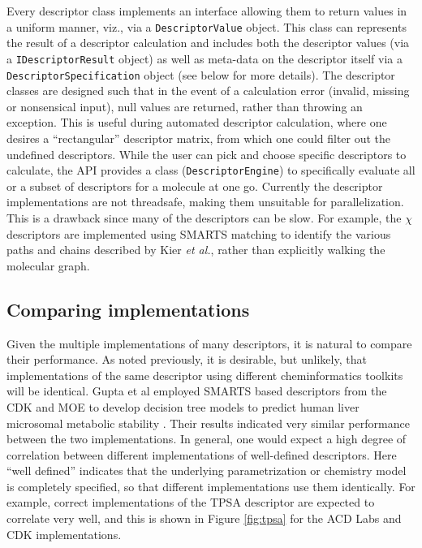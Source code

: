 \documentclass[letterpaper, 12pt]{article}
\begin{document}
Every descriptor class implements an interface allowing them to return
values in a uniform manner, viz., via a \texttt{DescriptorValue}
object. This class can represents the result of a descriptor
calculation and includes both the descriptor values (via a
\texttt{IDescriptorResult} object) as well as meta-data on the
descriptor itself via a \texttt{DescriptorSpecification} object (see
below for more details). The descriptor classes are designed such that
in the event of a calculation error (invalid, missing or nonsensical
input), null values are returned, rather than throwing an
exception. This is useful during automated descriptor calculation,
where one desires a ``rectangular'' descriptor matrix, from which one
could filter out the undefined descriptors. While the user can pick
and choose specific descriptors to calculate, the API provides a class
(\texttt{DescriptorEngine}) to specifically evaluate all or a subset
of descriptors for a molecule at one go.  Currently the descriptor
implementations are not threadsafe, making them unsuitable for
parallelization. This is a drawback since many of the descriptors can
be slow. For example, the $\chi$ descriptors \cite{Kier:1976aa} are
implemented using SMARTS matching to identify the various paths and
chains described by Kier \textit{et al.}, rather than explicitly
walking the molecular graph.

\subsection{Comparing implementations}
\label{sec:comp-impl}


Given the multiple implementations of many descriptors, it is natural
to compare their performance. As noted previously, it is desirable,
but unlikely, that implementations of the same descriptor using
different cheminformatics toolkits will be identical. Gupta et al
employed SMARTS based descriptors from the CDK and MOE to develop
decision tree models to predict human liver microsomal metabolic
stability \cite{Gupta:2010uq}. Their results indicated very similar
performance between the two implementations. In general, one would
expect a high degree of correlation between different implementations
of well-defined descriptors. Here ``well defined'' indicates that the
underlying parametrization or chemistry model is completely specified,
so that different implementations use them identically. For example,
correct implementations of the TPSA descriptor are expected to
correlate very well, and this is shown in Figure \ref{fig:tpsa} for
the ACD Labs and CDK implementations.
\end{document}
